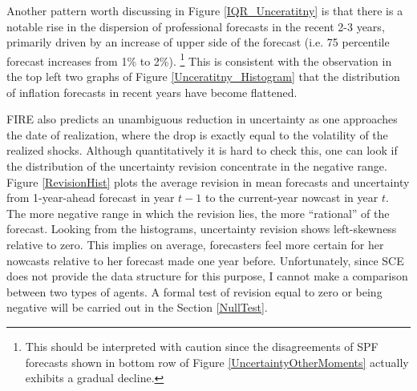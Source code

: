 \documentclass[12pt]{article}
\begin{document}
	Another pattern worth discussing in Figure \ref{IQR_Unceratitny} is that there is a notable rise in the dispersion of professional forecasts in the recent 2-3 years, primarily driven by an increase of upper side of the forecast (i.e. 75 percentile forecast increases from 1\% to 2\%). \footnote{This should be interpreted with caution since the disagreements of SPF forecasts shown in bottom row of Figure \ref{UncertaintyOtherMoments} actually exhibits a gradual decline. } This is consistent with the observation in the top left two graphs of Figure \ref{Unceratitny_Histogram} that the distribution of inflation forecasts in recent years have become flattened.
	
	FIRE also predicts an unambiguous reduction in uncertainty as one approaches the date of realization, where the drop is exactly equal to the volatility of the realized shocks. Although quantitatively it is hard to check this, one can look if the distribution of the uncertainty revision concentrate in the negative range. Figure \ref{RevisionHist} plots the average revision in mean forecasts and uncertainty from 1-year-ahead forecast in year $t-1$ to the current-year nowcast in year $t$. The more negative range in which the revision lies, the more ``rational'' of the forecast. Looking from the histograms, uncertainty revision shows left-skewness relative to zero. This implies on average,  forecasters feel more certain for her nowcasts relative to her forecast made one year before.  Unfortunately, since SCE does not provide the data structure for this purpose, I cannot make a comparison between two types of agents. A formal test of revision equal to zero or being negative will be carried out in the Section \ref{NullTest}. 
	
\end{document}
